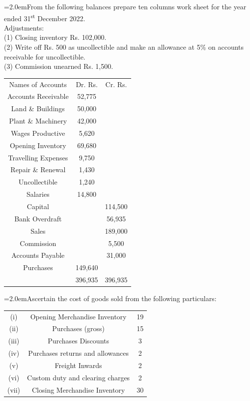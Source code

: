 \documentclass[11pt,a4paper]{article}
\newcommand{\lqn}[2]{\Needspace{6\baselineskip}\par\medskip\noindent\hangindent=2.0em\hangafter=1\makebox[2.0em][l]{\textbf{#1.}}#2\par}
\begin{document}
\lqn{113}{From the following balances prepare ten columns work sheet for the year ended 31\textsuperscript{st}  December 2022.\\
Adjustments:\\
(1) Closing inventory Rs. 102,000.\\
(2) Write off Rs. 500 as uncollectible and make an allowance at 5\% on accounts receivable for uncollectible.\\
(3) Commission unearned Rs. 1,500.\par
\par\smallskip\noindent\hspace*{1.2em}\begin{tabular}{|ccc|}
\hline
Names of Accounts & Dr. Rs. & Cr. Rs. \\
Accounts Receivable & 52,775 &  \\
Land \& Buildings & 50,000 &  \\
Plant \& Machinery & 42,000 &  \\
Wages Productive & 5,620 &  \\
Opening Inventory & 69,680 &  \\
Travelling Expenses & 9,750 &  \\
Repair \& Renewal & 1,430 &  \\
Uncollectible & 1,240 &  \\
Salaries & 14,800 &  \\
Capital &  & 114,500 \\
Bank Overdraft &  & 56,935 \\
Sales &  & 189,000 \\
Commission &  & 5,500 \\
Accounts Payable &  & 31,000 \\
Purchases & 149,640 &  \\
 & 396,935 & 396,935 \\
\hline
\end{tabular}\par\smallskip
}
\lqn{114}{Ascertain the cost of goods sold from the following particulars:\par
\par\smallskip\noindent\hspace*{1.2em}\begin{tabular}{|ccc|}
\hline
(i) & Opening Merchandise Inventory & 19 \\
(ii) & Purchases (gross) & 15 \\
(iii) & Purchases Discounts & 3 \\
(iv) & Purchases returns and allowances & 2 \\
(v) & Freight Inwards & 2 \\
(vi) & Custom duty and clearing charges & 2 \\
(vii) & Closing Merchandise Inventory & 30 \\
\hline
\end{tabular}\par\smallskip
}
\end{document}
